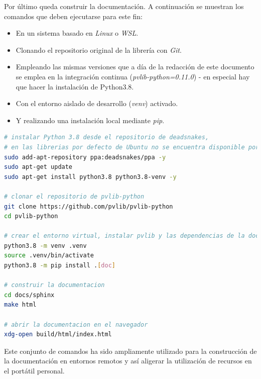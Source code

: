Por último queda construir la documentación. A continuación se muestran los comandos que deben ejecutarse para este fin:

\begin{itemize}
    \item En un sistema basado en \textit{Linux} o \textit{WSL}.
    \item Clonando el repositorio original de la librería con \textit{Git}.
    \item Empleando las mismas versiones que a día de la redacción de este documento se emplea en la integración continua (\textit{pvlib-python=0.11.0}) - en especial hay que hacer la instalación de Python3.8.
    \item Con el entorno aislado de desarrollo (\textit{venv}) activado.
    \item Y realizando una instalación local mediante \textit{pip}.
\end{itemize}

\begin{lstlisting}[language=bash, caption={Comandos para construir la documentación de \pvlibpy.}, label={lst:doc_build}]
# instalar Python 3.8 desde el repositorio de deadsnakes,
# en las librerias por defecto de Ubuntu no se encuentra disponible por antiguedad
sudo add-apt-repository ppa:deadsnakes/ppa -y
sudo apt-get update
sudo apt-get install python3.8 python3.8-venv -y

# clonar el repositorio de pvlib-python
git clone https://github.com/pvlib/pvlib-python
cd pvlib-python

# crear el entorno virtual, instalar pvlib y las dependencias de la documentacion
python3.8 -m venv .venv
source .venv/bin/activate
python3.8 -m pip install .[doc]

# construir la documentacion
cd docs/sphinx
make html

# abrir la documentacion en el navegador
xdg-open build/html/index.html
\end{lstlisting}

Este conjunto de comandos ha sido ampliamente utilizado para la construcción de la documentación en entornos remotos y así aligerar la utilización de recursos en el portátil personal.

